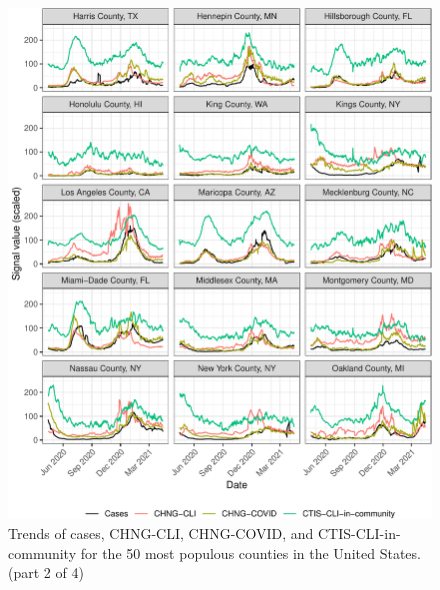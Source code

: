 \documentclass[9pt,twoside,lineno]{pnas-new}
\begin{document}
\begin{figure}

{\centering \includegraphics[width=\textwidth]{fig/county-trend-grids-2-1} 

}

\caption{Trends of cases, CHNG-CLI, CHNG-COVID, and CTIS-CLI-in-community for the 50 most populous counties in the United States. (part 2 of 4)}\label{fig:county-trend-grids-2}
\end{figure}

\clearpage
\end{document}
